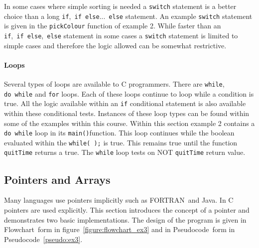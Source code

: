 \documentclass[11pt]{scrartcl}
\def\main{\texttt{main()}}
\def\psc{Pseudocode}
\def\flo{Flowchart}
\def\fortran{FORTRAN}
\begin{document}
In some cases where simple sorting is needed a \texttt{switch}
statement is a better choice than a long
\texttt{if},~\texttt{if~else}...~\texttt{else} statement.  An example
\texttt{switch} statement is given in the \texttt{pickColour} function
of example 2.  While faster than an
\texttt{if},~\texttt{if~else},~\texttt{else} statement in some cases a
\texttt{switch} statement is limited to simple cases and therefore the
logic allowed can be somewhat restrictive.

\paragraph{Loops}
Several types of loops are available to C programmers.  There are
\texttt{while}, \texttt{do~while} and \texttt{for} loops.  Each of
these loops continue to loop while a condition is true.  All the logic
available within an \texttt{if} conditional statement is also
available within these conditional tests.  Instances of these loop
types can be found within some of the examples within this course.
Within this section example 2 contains a \texttt{do~while} loop in its
\main function.  This loop continues while
the boolean evaluated within the \texttt{while(~);} is true.  This
remains true until the function \texttt{quitTime} returns a true.  The
\texttt{while} loop tests on NOT \texttt{quitTime} return value.

\subsection{Pointers and Arrays \label{section:pointersarrays}}

Many languages use pointers implicitly such as \fortran\ and Java.  In
C pointers are used explicitly.  This section introduces the concept
of a pointer and demonstrates two basic implementations.  The design
of the program is given in \flo\ form in
figure~\ref{figure:flowchart_ex3} and in \psc\ form in
\psc~\ref{pseudo:ex3}.
\end{document}
